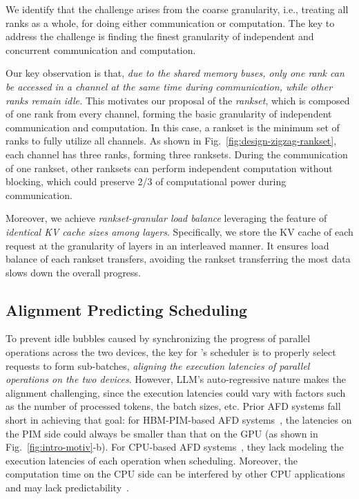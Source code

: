 We identify that the challenge arises from the coarse granularity, i.e., treating all ranks as a whole, for doing either communication or computation.
The key to address the challenge is finding the finest granularity of independent and concurrent communication and computation.




Our key observation is that, \emph{due to the shared memory buses, only one rank can be accessed in a channel at the same time during communication, while other ranks remain idle.}
This motivates our proposal of the \emph{rankset}, 
which is composed of one rank from every channel, forming the basic granularity of independent communication and computation.
In this case, a rankset is the minimum set of ranks to fully utilize all channels.
As shown in Fig.~\ref{fig:design-zigzag-rankset}, each channel has three ranks, forming three ranksets.
During the communication of one rankset, other ranksets can perform independent computation without blocking, 
which could preserve 2/3 of computational power during communication.


Moreover, we achieve \emph{rankset-granular load balance} leveraging the feature of \emph{identical KV cache sizes among layers}. 
Specifically, we store the KV cache of each request at the granularity of layers in an interleaved manner.
It ensures load balance of each rankset transfers, avoiding the rankset transferring the most data slows down the overall progress.













\subsection{Alignment Predicting Scheduling}
\label{sec:sys-scheduler}
To prevent idle bubbles caused by synchronizing the progress of parallel operations across the two devices, 
the key for \sys's scheduler is to properly select requests to form sub-batches, \emph{aligning the execution latencies of parallel operations on the two devices}.
However, LLM's auto-regressive nature makes the alignment challenging, since the execution latencies could vary with factors such as the number of processed tokens, the batch sizes, etc. 
Prior AFD systems fall short in achieving that goal:
for HBM-PIM-based AFD systems~\cite{park2024attacc,heo2024neupims}, the latencies on the PIM side could always be smaller than that on the GPU (as shown in Fig.~\ref{fig:intro-motiv}-b).
For CPU-based AFD systems~\cite{jiang2024neo}, they lack modeling the execution latencies of each operation when scheduling.
Moreover, the computation time on the CPU side can be interfered by other CPU applications and may lack predictability~\cite{christina2013paragon,liu2024jiagu,lo2015heracles}. 

